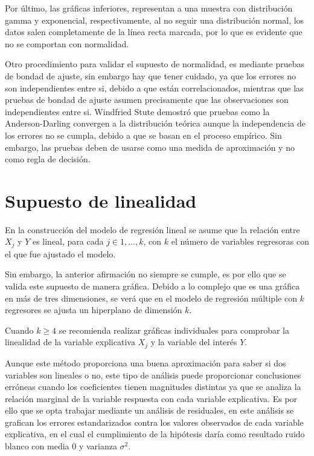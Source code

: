 \documentclass[a4paper,oneside,openany]{book}
\begin{document}
Por último, las gráficas inferiores, representan a una muestra con
distribución gamma y exponencial, respectivamente, al no seguir una
distribución normal, los datos salen completamente de la línea recta
marcada, por lo que es evidente que no se comportan con normalidad.

Otro procedimiento para validar el supuesto de normalidad, es mediante
pruebas de bondad de ajuste, sin embargo hay que tener cuidado, ya que
los errores no son independientes entre si, debido a que están
correlacionados, mientras que las pruebas de bondad de ajuste asumen
precisamente que las observaciones son independientes entre si.
Windfried Stute demostró que pruebas como la Anderson-Darling convergen
a la distribución teórica aunque la independencia de los errores no se
cumpla, debido a que se basan en el proceso empírico. Sin embargo, las
pruebas deben de usarse como una medida de aproximación y no como regla
de decisión.

\section{Supuesto de linealidad}\label{supuesto-de-linealidad}

En la construcción del modelo de regresión lineal se asume que la
relación entre \(X_{j}\) y \(Y\) es lineal, para cada
\(j \in 1,\ldots,k\), con \(k\) el número de variables regresoras con el
que fue ajustado el modelo.

Sin embargo, la anterior afirmación no siempre se cumple, es por ello
que se valida este supuesto de manera gráfica. Debido a lo complejo que
es una gráfica en más de tres dimensiones, se verá que en el modelo de
regresión múltiple con \(k\) regresores se ajusta un hiperplano de
dimensión \(k\).

Cuando \(k\geq4\) se recomienda realizar gráficas individuales para
comprobar la linealidad de la variable explicativa \(X_{j}\) y la
variable del interés \(Y\).

Aunque este método proporciona una buena aproximación para saber si dos
variables son lineales o no, este tipo de análisis puede proporcionar
conclusiones erróneas cuando los coeficientes tienen magnitudes
distintas ya que se analiza la relación marginal de la variable
respuesta con cada variable explicativa. Es por ello que se opta
trabajar mediante un análisis de residuales, en este análisis se
grafican los errores estandarizados contra los valores observados de
cada variable explicativa, en el cual el cumplimiento de la hipótesis
daría como resultado ruido blanco con media 0 y varianza \(\sigma^2.\)
\end{document}
